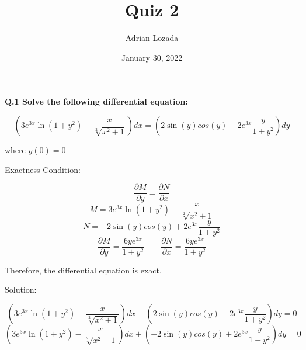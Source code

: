 \documentclass{article}
\author{Adrian Lozada}
\title{Quiz 2}
\date{January 30, 2022}
\begin{document}
    \maketitle
    
    \newpage
    \begin{flushleft}
        \textbf{Q.1 Solve the following differential equation:}
    \end{flushleft}
    \begin{center}
        \begin{equation}
            \left( 3e^{3x}\ln{(1+y^{2})}-\frac{x}{\sqrt[2]{x^{2}+1}} \right)dx 
            =
            \left(2\sin{(y)}cos{(y)}-2e^{3x}\frac{y}{1+y^{2}}\right)dy
        \end{equation}
    \end{center}
    \begin{flushleft}
        where $y(0)=0$
    \end{flushleft}
    \begin{flushleft}
        Exactness Condition:
    \end{flushleft}
    \begin{equation}
        \frac{\partial M}{\partial y} = \frac{\partial N}{\partial x}
    \end{equation}
    \begin{equation}
        M = 3e^{3x}\ln{(1+y^{2})}-\frac{x}{\sqrt[2]{x^{2}+1}}
    \end{equation}
    \begin{equation}
        N = -2\sin{(y)}cos{(y)}+2e^{3x}\frac{y}{1+y^{2}}
    \end{equation}
    \begin{equation}
        \frac{\partial M}{\partial y} = \frac{6ye^{3x}}{1+y^{2}}
        \qquad
        \frac{\partial N}{\partial x} = \frac{6ye^{3x}}{1+y^{2}}
    \end{equation}
    \begin{flushleft}
        Therefore, the differential equation is exact.
    \end{flushleft}
    \begin{flushleft}
        Solution:
    \end{flushleft}
    \begin{equation}
        \left( 3e^{3x}\ln{(1+y^{2})}-\frac{x}{\sqrt[2]{x^{2}+1}} \right)dx 
        -
        \left(2\sin{(y)}cos{(y)}-2e^{3x}\frac{y}{1+y^{2}}\right)dy = 0
    \end{equation}
    \begin{equation}
        \left( 3e^{3x}\ln{(1+y^{2})}-\frac{x}{\sqrt[2]{x^{2}+1}} \right)dx 
        +
        \left(-2\sin{(y)}cos{(y)}+2e^{3x}\frac{y}{1+y^{2}}\right)dy = 0
    \end{equation}
\end{document}
